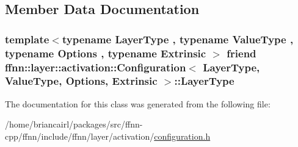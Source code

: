 \subsection{Member Data Documentation}
\hypertarget{classffnn_1_1layer_1_1activation_1_1_configuration_a183c2a31aadeb5f7f04c7caa65e079f0}{
\subsubsection[{Layer\-Type}]{\setlength{\rightskip}{0pt plus 5cm}template$<$typename Layer\-Type , typename Value\-Type , typename Options , typename Extrinsic $>$ friend {\bf ffnn\-::layer\-::activation\-::\-Configuration}$<$ Layer\-Type, Value\-Type, Options, Extrinsic $>$\-::Layer\-Type}}\label{classffnn_1_1layer_1_1activation_1_1_configuration_a183c2a31aadeb5f7f04c7caa65e079f0}


The documentation for this class was generated from the following file\-:\begin{DoxyCompactItemize}
\item 
/home/briancairl/packages/src/ffnn-\/cpp/ffnn/include/ffnn/layer/activation/\hyperlink{activation_2configuration_8h}{configuration.\-h}\end{DoxyCompactItemize}
